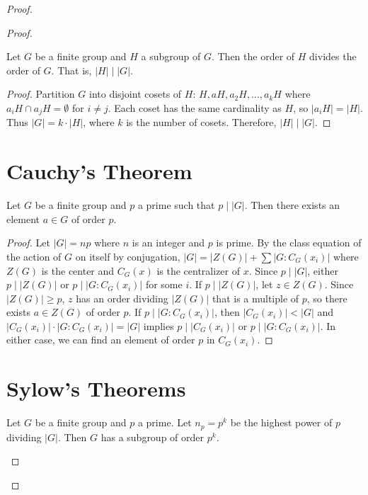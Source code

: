 \begin{proof}
\begin{proof}
\begin{theorem}
\label{thm:lagrange}
Let $G$ be a finite group and $H$ a subgroup of $G$. Then the order of $H$ divides the order of $G$. That is, $|H| \mid |G|$.
\end{theorem}

\begin{proof}
Partition $G$ into disjoint cosets of $H$: $H, aH, a_2H, \ldots, a_kH$ where $a_iH \cap a_jH = \emptyset$ for $i \neq j$.
Each coset has the same cardinality as $H$, so $|a_iH| = |H|$.
Thus $|G| = k \cdot |H|$, where $k$ is the number of cosets.
Therefore, $|H| \mid |G|$.
\end{proof}

\section{Cauchy's Theorem}
\label{sec:cauchy-theorem}

\begin{theorem}
\label{thm:cauchy}
Let $G$ be a finite group and $p$ a prime such that $p \mid |G|$. Then there exists an element $a \in G$ of order $p$.
\end{theorem}

\begin{proof}
Let $|G| = np$ where $n$ is an integer and $p$ is prime. By the class equation of the action of $G$ on itself by conjugation, $|G| = |Z(G)| + \sum |G : C_G(x_i)|$ where $Z(G)$ is the center and $C_G(x)$ is the centralizer of $x$.
Since $p \mid |G|$, either $p \mid |Z(G)|$ or $p \mid |G : C_G(x_i)|$ for some $i$.
If $p \mid |Z(G)|$, let $z \in Z(G)$. Since $|Z(G)| \geq p$, $z$ has an order dividing $|Z(G)|$ that is a multiple of $p$, so there exists $a \in Z(G)$ of order $p$.
If $p \mid |G : C_G(x_i)|$, then $|C_G(x_i)| < |G|$ and $|C_G(x_i)| \cdot |G : C_G(x_i)| = |G|$ implies $p \mid |C_G(x_i)|$ or $p \mid |G : C_G(x_i)|$. In either case, we can find an element of order $p$ in $C_G(x_i)$.
\end{proof}

\section{Sylow's Theorems}
\label{sec:sylow-theorems}

\begin{theorem}
\label{thm:sylow-1}
Let $G$ be a finite group and $p$ a prime. Let $n_p = p^k$ be the highest power of $p$ dividing $|G|$. Then $G$ has a subgroup of order $p^k$.
\end{theorem}


\end{proof}
\end{proof}
